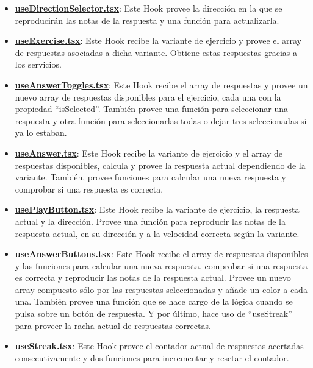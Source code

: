 \documentclass[12pt,twoside,titlepage]{report}
\begin{document}
\begin{itemize}
    \item \href{https://github.com/alberttogoca/EarFit/blob/main/src/hooks/useDirectionSelector.tsx}{\textbf{useDirectionSelector.tsx}}: Este Hook provee la dirección en la que se reproducirán las notas de la respuesta y una función para actualizarla.
    \item \href{https://github.com/alberttogoca/EarFit/blob/main/src/hooks/useExercise.tsx}{\textbf{useExercise.tsx}}: Este Hook recibe la variante de ejercicio y provee el array de respuestas asociadas a dicha variante. Obtiene estas respuestas gracias a los servicios.
    \item \href{https://github.com/alberttogoca/EarFit/blob/main/src/hooks/useAnswerToggles.tsx}{\textbf{useAnswerToggles.tsx}}: Este Hook recibe el array de respuestas y provee un nuevo array de respuestas disponibles para el ejercicio, cada una con la propiedad ``isSelected''. También provee una función para seleccionar una respuesta y otra función para seleccionarlas todas o dejar tres seleccionadas si ya lo estaban.
    \item \href{https://github.com/alberttogoca/EarFit/blob/main/src/hooks/useAnswer.tsx}{\textbf{useAnswer.tsx}}: Este Hook recibe la variante de ejercicio y el array de respuestas disponibles, calcula y provee la respuesta actual dependiendo de la variante. También, provee funciones para calcular una nueva respuesta y comprobar si una respuesta es correcta.
    \item \href{https://github.com/alberttogoca/EarFit/blob/main/src/hooks/usePlayButton.tsx}{\textbf{usePlayButton.tsx}}: Este Hook recibe la variante de ejercicio, la respuesta actual y la dirección. Provee una función para reproducir las notas de la respuesta actual, en su dirección y a la velocidad correcta según la variante.
    \item \href{https://github.com/alberttogoca/EarFit/blob/main/src/hooks/useAnswerButtons.tsx}{\textbf{useAnswerButtons.tsx}}:  Este Hook recibe el array de respuestas disponibles y las funciones para calcular una nueva respuesta, comprobar si una respuesta es correcta y reproducir las notas de la respuesta actual. Provee un nuevo array compuesto sólo por las respuestas seleccionadas y añade un color a cada una. También provee una función que se hace cargo de la lógica cuando se pulsa sobre un botón de respuesta. Y por último, hace uso de ``useStreak'' para proveer la racha actual de respuestas correctas.
    \item \href{https://github.com/alberttogoca/EarFit/blob/main/src/hooks/useStreak.tsx}{\textbf{useStreak.tsx}}: Este Hook provee el contador actual de respuestas acertadas consecutivamente y dos funciones para incrementar y resetar el contador.

\end{itemize}
\end{document}
